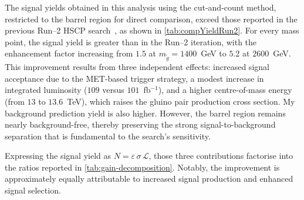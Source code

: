 \vspace{0.5 cm}

The signal yields obtained in this analysis using the cut-and-count method, restricted to the barrel region for direct comparison, exceed those reported in the previous Run--2 HSCP search~\cite{HSCP_Run2}, as shown in \cref{tab:compYieldRun2}. For every mass point, the signal yield is greater than in the Run--2 iteration, with the enhancement factor increasing from $1.5$ at $m_{\tilde{g}} = 1400$~GeV to $5.2$ at $2600$~GeV. This improvement results from three independent effects: increased signal acceptance due to the MET-based trigger strategy, a modest increase in integrated luminosity ($109$ versus $101$~fb$^{-1}$), and a higher centre-of-mass energy (from $13$ to $13.6$~TeV), which raises the gluino pair production cross section. My background prediction yield is also higher. However, the barrel region remains nearly background-free, thereby preserving the strong signal-to-background separation that is fundamental to the search's sensitivity.

Expressing the signal yield as $N = \varepsilon\,\sigma\,\mathcal{L}$, those three contributions factorise into the ratios reported in \cref{tab:gain-decomposition}. Notably, the improvement is approximately equally attributable to increased signal production and enhanced signal selection.

